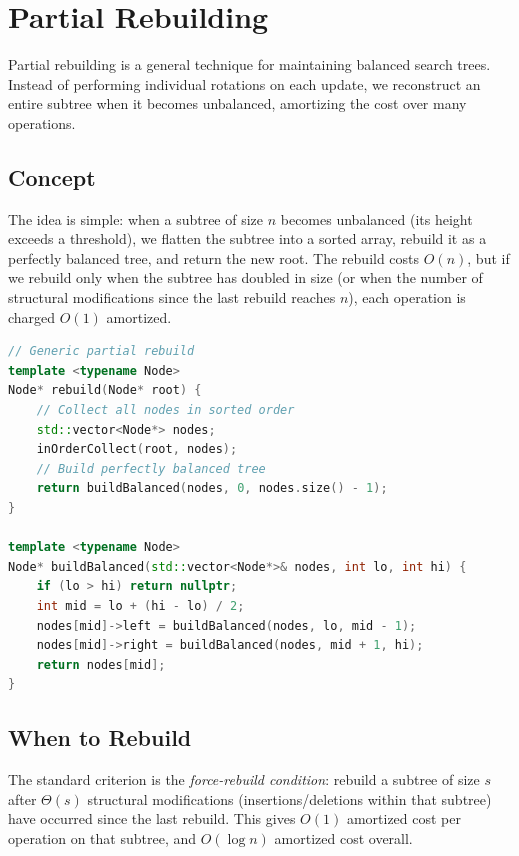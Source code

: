\section{Partial Rebuilding}
\label{sec:partial-rebuilding}

Partial rebuilding is a general technique for maintaining balanced search trees. Instead of performing individual rotations on each update, we reconstruct an entire subtree when it becomes unbalanced, amortizing the cost over many operations.

\subsection{Concept}
\label{sec:partial-concept}

The idea is simple: when a subtree of size $n$ becomes unbalanced (its height exceeds a threshold), we flatten the subtree into a sorted array, rebuild it as a perfectly balanced tree, and return the new root. The rebuild costs $O(n)$, but if we rebuild only when the subtree has doubled in size (or when the number of structural modifications since the last rebuild reaches $n$), each operation is charged $O(1)$ amortized.

\begin{lstlisting}[language=C++]
// Generic partial rebuild
template <typename Node>
Node* rebuild(Node* root) {
    // Collect all nodes in sorted order
    std::vector<Node*> nodes;
    inOrderCollect(root, nodes);
    // Build perfectly balanced tree
    return buildBalanced(nodes, 0, nodes.size() - 1);
}

template <typename Node>
Node* buildBalanced(std::vector<Node*>& nodes, int lo, int hi) {
    if (lo > hi) return nullptr;
    int mid = lo + (hi - lo) / 2;
    nodes[mid]->left = buildBalanced(nodes, lo, mid - 1);
    nodes[mid]->right = buildBalanced(nodes, mid + 1, hi);
    return nodes[mid];
}
\end{lstlisting}

\subsection{When to Rebuild}
\label{sec:rebuild-trigger}

The standard criterion is the \emph{force-rebuild condition}: rebuild a subtree of size $s$ after $\Theta(s)$ structural modifications (insertions/deletions within that subtree) have occurred since the last rebuild. This gives $O(1)$ amortized cost per operation on that subtree, and $O(\log n)$ amortized cost overall.

